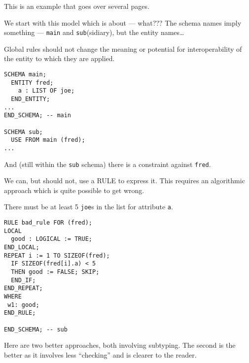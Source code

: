 \begin{remarks}
\remintro
{}

    This is an example that goes over several pages.

We start with this model which is about --- what??? The schema
names imply something --- \texttt{main} and \texttt{sub}(sidiary),
but the entity names\ldots

\remend
\end{remarks}


    Global rules should not change the meaning or potential for 
interoperability of the entity to which they are applied.

\begin{verbatim}
SCHEMA main;
  ENTITY fred;
    a : LIST OF joe;
  END_ENTITY;
...
END_SCHEMA; -- main

SCHEMA sub;
  USE FROM main (fred);
...
\end{verbatim}



\begin{remarks}
\remintro
{}

And (still within the \texttt{sub} schema) there is a constraint 
against \texttt{fred}.

We can, but should not, use a RULE to express it. This requires
an algorithmic approach which is quite possible to get wrong.

\remend
\end{remarks}

\clearpage

There must be at least 5 \texttt{joe}s in the list
for attribute \texttt{a}.


\begin{verbatim}
RULE bad_rule FOR (fred);
LOCAL
  good : LOGICAL := TRUE;
END_LOCAL;
REPEAT i := 1 TO SIZEOF(fred);
  IF SIZEOF(fred[i].a) < 5
  THEN good := FALSE; SKIP;
  END_IF;
END_REPEAT;
WHERE
 w1: good;
END_RULE;

END_SCHEMA; -- sub
\end{verbatim}



\begin{remarks}
\remintro
{}

Here are two better approaches, both involving subtyping. The second
is the better as it involves less ``checking'' and is clearer
to the reader.

\remend
\end{remarks}

